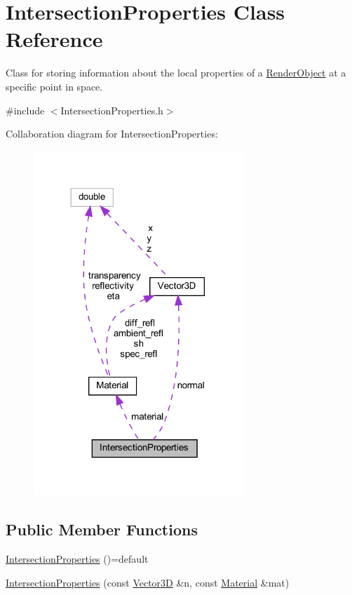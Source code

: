 \hypertarget{classIntersectionProperties}{}\section{Intersection\+Properties Class Reference}
\label{classIntersectionProperties}


Class for storing information about the local properties of a \mbox{\hyperlink{classRenderObject}{Render\+Object}} at a specific point in space.  




{\ttfamily \#include $<$Intersection\+Properties.\+h$>$}



Collaboration diagram for Intersection\+Properties\+:
\nopagebreak
\begin{figure}[H]
\begin{center}
\leavevmode
\includegraphics[width=224pt]{classIntersectionProperties__coll__graph}
\end{center}
\end{figure}
\subsection*{Public Member Functions}
\begin{DoxyCompactItemize}
\item 
\mbox{\hyperlink{classIntersectionProperties_af6f71f18a350a95cfab225d5f13be280}{Intersection\+Properties}} ()=default
\item 
\mbox{\hyperlink{classIntersectionProperties_a375cfefda4657bdc278504213347bde8}{Intersection\+Properties}} (const \mbox{\hyperlink{classVector3D}{Vector3D}} \&n, const \mbox{\hyperlink{classMaterial}{Material}} \&mat)
\end{DoxyCompactItemize}
